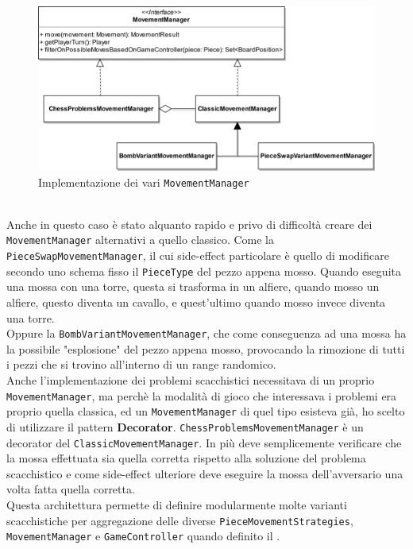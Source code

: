 \documentclass[a4paper,12pt]{report}
\begin{document}
\begin{figure}[H]
\centering{}
\includegraphics[scale=0.9]{img/Stefano/FocusMovementManager.png}
\caption{Implementazione dei vari \texttt{MovementManager}}
\label{img:FocusMovementManager}
\end{figure}
\
\\
Anche in questo caso è stato alquanto rapido e privo di difficoltà creare dei \texttt{MovementManager} alternativi a quello classico. Come la \texttt{PieceSwapMovementManager}, il cui side-effect particolare è quello di modificare secondo uno schema fisso il \texttt{PieceType} del pezzo appena mosso. Quando eseguita una mossa con una torre, questa si trasforma in un alfiere, quando mosso un alfiere, questo diventa un cavallo, e quest'ultimo quando mosso invece diventa una torre.\\
Oppure la \texttt{BombVariantMovementManager}, che come conseguenza ad una mossa ha la possibile "esplosione" del pezzo appena mosso, provocando la rimozione di tutti i pezzi che si trovino all'interno di un range randomico.
\
\\
Anche l'implementazione dei problemi scacchistici necessitava di un proprio \texttt{MovementManager}, ma perchè la modalità di gioco che interessava i problemi era proprio quella classica, ed un \texttt{MovementManager} di quel tipo esisteva già, ho scelto di utilizzare il pattern \textbf{Decorator}.
\texttt{ChessProblemsMovementManager} è un decorator del \texttt{ClassicMovementManager}. In più deve semplicemente verificare che la mossa effettuata sia quella corretta rispetto alla soluzione del problema scacchistico e come side-effect ulteriore deve eseguire la mossa dell'avversario una volta fatta quella corretta.
\\
Questa architettura permette di definire modularmente molte varianti scacchistiche per aggregazione delle diverse \texttt{PieceMovementStrategies}, \texttt{MovementManager} e \texttt{GameController} quando definito il \texttt{\nameref{Game}}.  
\end{document}
